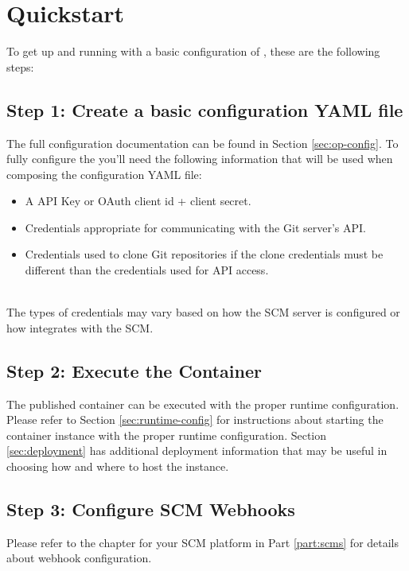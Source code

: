 \chapter{Quickstart}

To get up and running with a basic configuration of \cxoneflowns, these are the following steps:


\section{Step 1: Create a basic configuration YAML file}

The full configuration documentation can be found in Section \ref{sec:op-config}. To fully configure the \cxoneflow you'll need
the following information that will be used when composing the configuration YAML file:

\begin{itemize}
    \item A \cxone API Key or OAuth client id + client secret.
    \item Credentials appropriate for communicating with the Git server's API.
    \item Credentials used to clone Git repositories if the clone credentials must be different than the credentials used for API access.
\end{itemize}

\noindent\\The types of credentials may vary based on how the SCM server is configured or how \cxoneflow
integrates with the SCM.

\section{Step 2: Execute the \cxoneflowtext\space Container}

The published \cxoneflow container can be executed with the proper runtime configuration.  Please refer
to Section \ref{sec:runtime-config} for instructions about starting the \cxoneflow container instance with
the proper runtime configuration. Section \ref{sec:deployment} has additional deployment information that
may be useful in choosing how and where to host the \cxoneflow instance.


\section{Step 3: Configure SCM Webhooks}

Please refer to the chapter for your SCM platform in Part \ref{part:scms} for details about webhook configuration.


